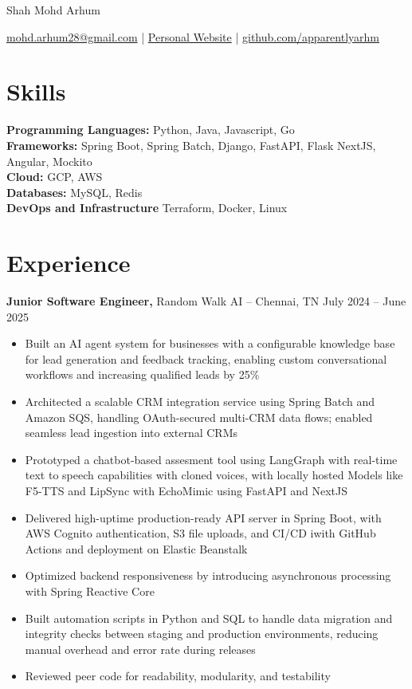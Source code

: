 \documentclass[12pt]{article}       %
\begin{document}
\centerline{\Huge Shah Mohd Arhum}

\vspace{5pt}

\centerline{\href{mailto:mohd.arhum28@gmail.com}{mohd.arhum28@gmail.com} | \href{https://arhm.dev/}{Personal Website} | \href{https://github.com/apparentlyarhm}{github.com/apparentlyarhm}}

\vspace{-10pt}

\section*{Skills}
\textbf{Programming Languages:} Python, Java, Javascript, Go \\
\textbf{Frameworks:} Spring Boot, Spring Batch, Django, FastAPI, Flask NextJS, Angular, Mockito \\
\textbf{Cloud:} GCP, AWS \\
\textbf{Databases:} MySQL, Redis \\
\textbf{DevOps and Infrastructure} Terraform, Docker, Linux

\vspace{-6.5pt}

\section*{Experience}
\textbf{Junior Software Engineer,} {Random Walk AI} -- Chennai, TN \hfill July 2024 -- June 2025 \\
\vspace{-9pt}
\begin{itemize}
    \item Built an AI agent system for businesses with a configurable knowledge base for lead generation and feedback tracking, enabling custom conversational workflows and increasing qualified leads by 25\%
    \item Architected a scalable CRM integration service using Spring Batch and Amazon SQS, handling OAuth-secured multi-CRM data flows; enabled seamless lead ingestion into external CRMs
    \item Prototyped a chatbot-based assesment tool using LangGraph with real-time text to speech capabilities with cloned voices, with locally hosted Models like F5-TTS and LipSync with EchoMimic using FastAPI and NextJS
    \item Delivered high-uptime production-ready API server in Spring Boot, with AWS Cognito authentication, S3 file uploads, and CI/CD iwith GitHub Actions and deployment on Elastic Beanstalk    \item Optimized backend responsiveness by introducing asynchronous processing with Spring Reactive Core 
    \item Built automation scripts in Python and SQL to handle data migration and integrity checks between staging and production environments, reducing manual overhead and error rate during releases
    \item Reviewed peer code for readability, modularity, and testability

\end{itemize}
\end{document}
